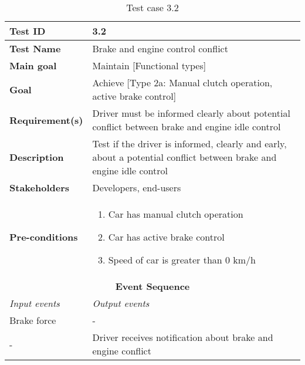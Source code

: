 \begin{table}[H]
\centering
\begin{tabularx}{\linewidth}{X|X}
  \hline
  \textbf{Test ID} & 3.2\\
  \hline
  \textbf{Test Name} &  Brake and engine control conflict\\
  \hline
  \textbf{Main goal} &  Maintain [Functional types]\\
  \hline
  \textbf{Goal} & Achieve [Type 2a: Manual clutch operation, active brake control] \\
  \hline
  \textbf{Requirement(s)} &  Driver must be informed clearly about potential conflict between brake and engine idle control\\
  \hline
  \textbf{Description} &  Test if the driver is informed, clearly and early, about a potential conflict between brake and engine idle control\\
  \hline
  \textbf{Stakeholders} &  Developers, end-users\\
  \hline
  \textbf{Pre-conditions} &  
  \begin{enumerate}
      \item Car has manual clutch operation
      \item Car has active brake control
      \item Speed of car is greater than 0 km/h
  \end{enumerate}\\
  \hline
  \multicolumn{2}{c}{\textbf{Event Sequence}} \\
  \hline
  \textit{Input events} & \textit{Output events} \\
  \hline
   Brake force & - \\
  \hline
   - & Driver receives notification about brake and engine conflict \\
  \hline
  \end{tabularx}
\caption{\label{tab_caseX} Test case 3.2}
\end{table}


